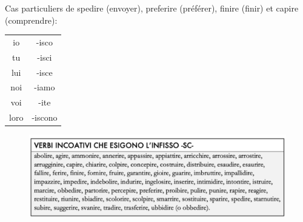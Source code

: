 \documentclass[12pt, openany]{report}
\begin{document}
\begin{minipage}{.35\textwidth}
    Cas particuliers de spedire (envoyer), preferire (préférer), finire (finir) et capire (comprendre):
    \begin{center}
        \begin{tabular}{c||c}
            io & -isco \\
            tu & -isci \\
            lui & -isce \\
            noi & -iamo \\
            voi & -ite \\
            loro & -iscono \\
        \end{tabular}
    \end{center}
\end{minipage}
\begin{minipage}{.65\textwidth}
    \centering 
    \begin{figure}[H]
        \includegraphics[width = \textwidth]{img/isco.png}
    \end{figure}
\end{minipage}
\end{document}
